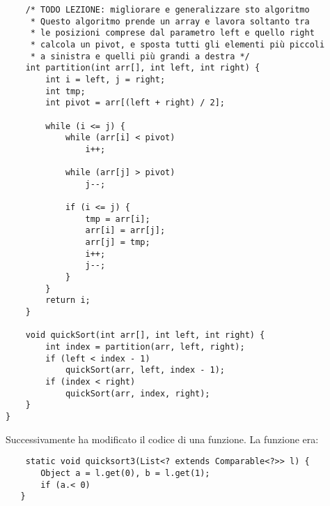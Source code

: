 \begin{lstlisting}
    /* TODO LEZIONE: migliorare e generalizzare sto algoritmo 
     * Questo algoritmo prende un array e lavora soltanto tra
     * le posizioni comprese dal parametro left e quello right
     * calcola un pivot, e sposta tutti gli elementi più piccoli 
     * a sinistra e quelli più grandi a destra */
    int partition(int arr[], int left, int right) {
        int i = left, j = right;
        int tmp;
        int pivot = arr[(left + right) / 2];

        while (i <= j) {
            while (arr[i] < pivot)
                i++;

            while (arr[j] > pivot)
                j--;

            if (i <= j) {
                tmp = arr[i];
                arr[i] = arr[j];
                arr[j] = tmp;
                i++;
                j--;
            }
        }
        return i;
    }

    void quickSort(int arr[], int left, int right) {
        int index = partition(arr, left, right);
        if (left < index - 1)
            quickSort(arr, left, index - 1);
        if (index < right)
            quickSort(arr, index, right);
    }
}
\end{lstlisting}
\noindent Successivamente ha modificato il codice di una funzione. La funzione era:
\begin{lstlisting}
    static void quicksort3(List<? extends Comparable<?>> l) {
       Object a = l.get(0), b = l.get(1);
       if (a.< 0)
   } 
\end{lstlisting}

